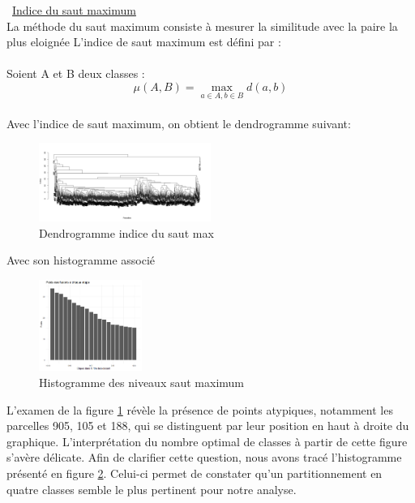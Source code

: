 \documentclass{article}
\begin{document}
\textbullet\ \underline{Indice du saut maximum}
\\
La méthode du saut maximum consiste à mesurer la similitude avec la paire la plus eloignée
L'indice de saut maximum est défini par :
\\
\\
Soient A et B deux classes :
\[
\mu(A,B) = \max_{a \in A , b \in B} d(a,b)
\]
\\
Avec l'indice de saut maximum, on obtient le dendrogramme suivant:
\\
\begin{figure}[H]
    \centering
    \includegraphics[width=0.5\textwidth]{RRRR.png}
    \caption{Dendrogramme  indice du saut max}
    \label{fig:dendmax} 
\end{figure}
Avec son histogramme associé
\\
\begin{figure}[H]
    \centering
    \includegraphics[width=0.3\textwidth]{histomax4.png}
    \caption{Histogramme des niveaux saut maximum}
    \label{fig:histomax} 
\end{figure}
L'examen de la figure \ref{fig:dendmax} révèle la présence de points atypiques, notamment les parcelles 905, 105 et 188, qui se distinguent par leur position en haut à droite du graphique. L'interprétation du nombre optimal de classes à partir de cette figure s'avère délicate. Afin de clarifier cette question, nous avons tracé l'histogramme présenté en figure \ref{fig:histomax}. Celui-ci permet de constater qu'un partitionnement en quatre classes semble le plus pertinent pour notre analyse.
\\\\
\end{document}
